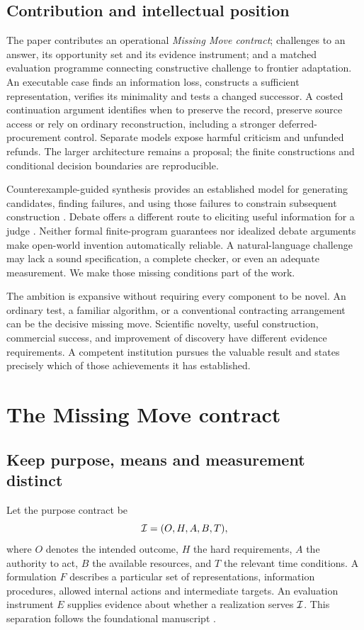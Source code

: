\subsection{Contribution and intellectual position}
The paper contributes an operational \emph{Missing Move contract}; challenges to an answer, its opportunity set and its evidence instrument; and a matched evaluation programme connecting constructive challenge to frontier adaptation. An executable case finds an information loss, constructs a sufficient representation, verifies its minimality and tests a changed successor. A costed continuation argument identifies when to preserve the record, preserve source access or rely on ordinary reconstruction, including a stronger deferred-procurement control. Separate models expose harmful criticism and unfunded refunds. The larger architecture remains a proposal; the finite constructions and conditional decision boundaries are reproducible.

Counterexample-guided synthesis provides an established model for generating candidates, finding failures, and using those failures to constrain subsequent construction \citep{cegis}. Debate offers a different route to eliciting useful information for a judge \citep{debate}. Neither formal finite-program guarantees nor idealized debate arguments make open-world invention automatically reliable. A natural-language challenge may lack a sound specification, a complete checker, or even an adequate measurement. We make those missing conditions part of the work.

The ambition is expansive without requiring every component to be novel. An ordinary test, a familiar algorithm, or a conventional contracting arrangement can be the decisive missing move. Scientific novelty, useful construction, commercial success, and improvement of discovery have different evidence requirements. A competent institution pursues the valuable result and states precisely which of those achievements it has established.

\section{The Missing Move contract}
\label{sec:contract}
\subsection{Keep purpose, means and measurement distinct}
Let the purpose contract be
\begin{equation}
\mathcal{I}=(O,H,A,B,T),
\end{equation}
where $O$ denotes the intended outcome, $H$ the hard requirements, $A$ the authority to act, $B$ the available resources, and $T$ the relevant time conditions. A formulation $F$ describes a particular set of representations, information procedures, allowed internal actions and intermediate targets. An evaluation instrument $E$ supplies evidence about whether a realization serves $\mathcal{I}$. This separation follows the foundational manuscript \citep[\S2]{boucher_ti}.

